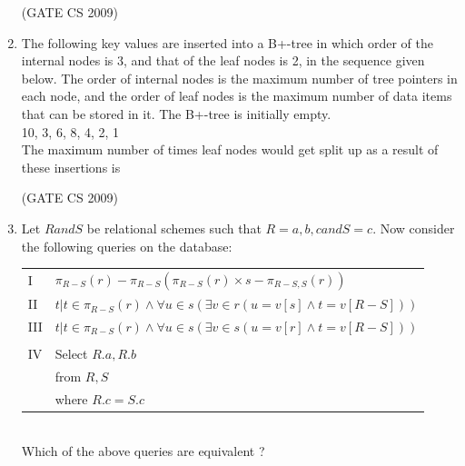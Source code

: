 \documentclass[a4paper, 11pt]{article}
\begin{document}
\begin{enumerate}
    \hfill (GATE CS 2009)

    \item The following key values are inserted into a B+-tree in which order of the internal nodes is 3, and that of the leaf nodes is 2, in the sequence given below. The order of internal nodes is the maximum number of tree pointers in each node, and the order of leaf nodes is the maximum number of data items that can be stored in it. The B+-tree is initially empty.\\
    10, 3, 6, 8, 4, 2, 1\\
    The maximum number of times leaf nodes would get split up as a result of these insertions is\\
    \begin{enumerate}
    \end{enumerate}

    \hfill (GATE CS 2009)

    \item Let $R and S$ be relational schemes such that $R= {a,b,c} and S = {c}$. Now consider the following queries on the database:\\
    \begin{tabular}{ll}
        I & $\pi_{R-S}(r)-\pi_{R-S}(\pi_{R-S}(r)\times s-\pi_{R-S,S}(r))$ \\
        II & ${t|t \in \pi_{R-S}(r) \land \forall u \in s(\exists v \in r(u=v[s] \land t=v[R-S]))}$\\
        III & ${t|t \in \pi_{R-S}(r) \land \forall u \in s(\exists v \in s(u=v[r] \land t=v[R-S]))}$\\ \\
        IV & Select $R.a, R.b$\\
           & from $R, S$\\
           & where $R.c=S.c$
    \end{tabular}\\

    Which of the above queries are equivalent ?\\
    \begin{enumerate}
    \end{enumerate}


\end{enumerate}
\end{document}
